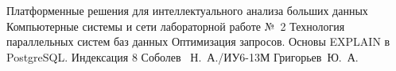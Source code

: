 \makereporttitle
{Платформенные решения для интеллектуального анализа больших данных}
{Компьютерные системы и сети}
{лабораторной работе №~2}
{Технология параллельных систем баз данных}
{Оптимизация запросов. Основы EXPLAIN в PostgreSQL. Индексация}
{8}
{Соболев ~Н.~А./ИУ6-13М}
{Григорьев~Ю.~А.}

\newpage